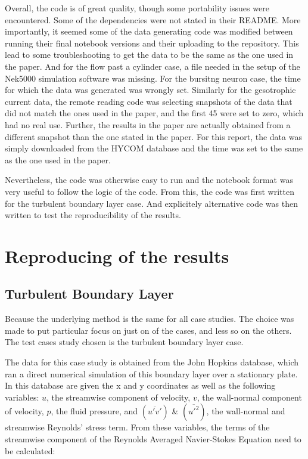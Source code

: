 \documentclass[12pt]{report} %
\begin{document}
Overall, the code is of great quality, though some portability issues were encountered. Some of the dependencies were not stated in their README. More importantly, it seemed some of the data generating code was modified between running their final notebook versions and their uploading to the repository. This lead to some troubleshooting to get the data to be the same as the one used in the paper. And for the flow past a cylinder case, a file needed in the setup of the Nek5000 simulation software was missing\cite{nek5000setup}. For the bursitng neuron case, the time for which the data was generated was wrongly set. Similarly for the gesotrophic current data, the remote reading code was selecting snapshots of the data that did not match the ones used in the paper, and the first 45 were set to zero, which had no real use. Further, the results in the paper are actually obtained from a different snapshot than the one stated in the paper. For this report, the data was simply downloaded from the HYCOM database \cite{hycom} and the time was set to the same as the one used in the paper.

Nevertheless, the code was otherwise easy to run and the notebook format was very useful to follow the logic of the code. From this, the code was first written for the turbulent boundary layer case. And explicitely alternative code was then written to test the reproducibility of the results.

\section{Reproducing of the results}

\subsection{Turbulent Boundary Layer}

Because the underlying method is the same for all case studies. The choice was made to put particular focus on just on of the cases, and less so on the others. The test cases study chosen is the turbulent boundary layer case.

The data for this case study is obtained from the John Hopkins database, which ran a direct numerical simulation of this boundary layer over a stationary plate\cite{jhtdb}. In this database are given the x and y coordinates as well as the following variables: $u$, the streamwise component of velocity, $v$, the wall-normal component of velocity, $p$, the fluid pressure, and $(\overline{u' v'})$ \& $(\overline{u'^2})$, the wall-normal and streamwise Reynolds' stress term. From these variables, the terms of the streamwise component of the Reynolds Averaged Navier-Stokes Equation need to be calculated:
\end{document}
